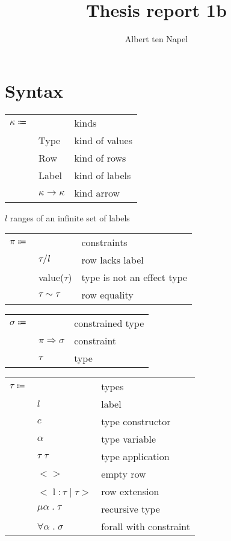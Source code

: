 \documentclass[12pt]{article}
\title{Thesis report 1b}
\author{Albert ten Napel}
\date{}
\begin{document}
\section{Syntax}

\begin{tabular}{l l l}
	$\kappa \Coloneqq$ & & kinds \\
		& Type & kind of values \\
		& Row & kind of rows \\
		& Label & kind of labels \\
		& $\kappa \rightarrow \kappa$ & kind arrow \\
\end{tabular}

\vspace{15pt}\noindent
$l$ ranges of an infinite set of labels \\

\vspace{15pt}\noindent
\begin{tabular}{l l l}
	$\pi \Coloneqq$ & & constraints \\
		& $\tau / l$ & row lacks label \\
		& value($\tau$) & type is not an effect type \\
		& $\tau \sim \tau$ & row equality \\
\end{tabular}

\vspace{15pt}\noindent
\begin{tabular}{l l l}
	$\sigma \Coloneqq$ & & constrained type \\
		& $\pi \Rightarrow \sigma$ & constraint \\
		& $\tau$ & type \\
\end{tabular}

\vspace{15pt}\noindent
\begin{tabular}{l l l}
	$\tau \Coloneqq$ & & types \\
		& $l$ & label \\
		& $c$ & type constructor \\
		& $\alpha$ & type variable\\
		& $\tau \; \tau$ & type application \\
		& $<>$ & empty row \\ 
		& $< \; $l$ \; : \tau \; | \; \tau >$ & row extension \\
		& $\mu \alpha \; . \; \tau$ & recursive type \\
		& $\forall \alpha \; . \; \sigma$ & forall with constraint \\
\end{tabular}
\end{document}
